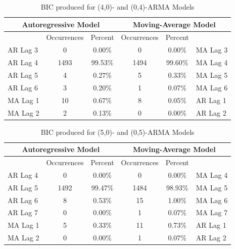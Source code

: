 \documentclass[oneside,12pt,openany]{book}
\begin{document}
      \begin{table}[!ht]
          \centering
          \begin{tabular}{|l|c|c|c|c|l|}
              \hline
              \multicolumn{3}{|c|}{Autoregressive Model} & \multicolumn{3}{c|}{Moving-Average Model} \\ \hline
              \cellcolor{black} & Occurrences & Percent & Occurrences & Percent & \cellcolor{black} \\ \hline
              AR Lag 3 & 0 & 0.00\% & 0 & 0.00\% & MA Lag 3 \\ \hline
              AR Lag 4 & 1493 & 99.53\% & 1494 & 99.60\% & MA Lag 4 \\ \hline
              AR Lag 5 & 4 & 0.27\% & 5 & 0.33\% & MA Lag 5 \\ \hline
              AR Lag 6 & 3 & 0.20\% & 1 & 0.07\% & MA Lag 6 \\ \hline
              MA Lag 1 & 10 & 0.67\% & 8 & 0.05\% & AR Lag 1 \\ \hline
              MA Lag 2 & 2 & 0.13\% & 0 & 0.00\% & AR Lag 2 \\ \hline
          \end{tabular}
         \caption{BIC produced for (4,0)- and (0,4)-ARMA Models}
        \label{tab:bic4}
      \end{table}
  
    \begin{table}[!ht]
        \centering
        \begin{tabular}{|l|c|c|c|c|l|}
            \hline
            \multicolumn{3}{|c|}{Autoregressive Model} & \multicolumn{3}{c|}{Moving-Average Model} \\ \hline
            \cellcolor{black} & Occurrences & Percent & Occurrences & Percent & \cellcolor{black} \\ \hline
            AR Lag 4 & 0 & 0.00\% & 0 & 0.00\% & MA Lag 4 \\ \hline
            AR Lag 5 & 1492 & 99.47\% & 1484 & 98.93\% & MA Lag 5 \\ \hline
            AR Lag 6 & 8 & 0.53\% & 15 & 1.00\% & MA Lag 6 \\ \hline
            AR Lag 7 & 0 & 0.00\% & 1 & 0.07\% & MA Lag 7 \\ \hline
            MA Lag 1 & 5 & 0.33\% & 11 & 0.73\% & AR Lag 1 \\ \hline
            MA Lag 2 & 0 & 0.00\% & 1 & 0.07\% & AR Lag 2 \\ \hline
        \end{tabular}
        \caption{BIC produced for (5,0)- and (0,5)-ARMA Models}
        \label{tab:bic5}
    \end{table}
    
\end{document}
